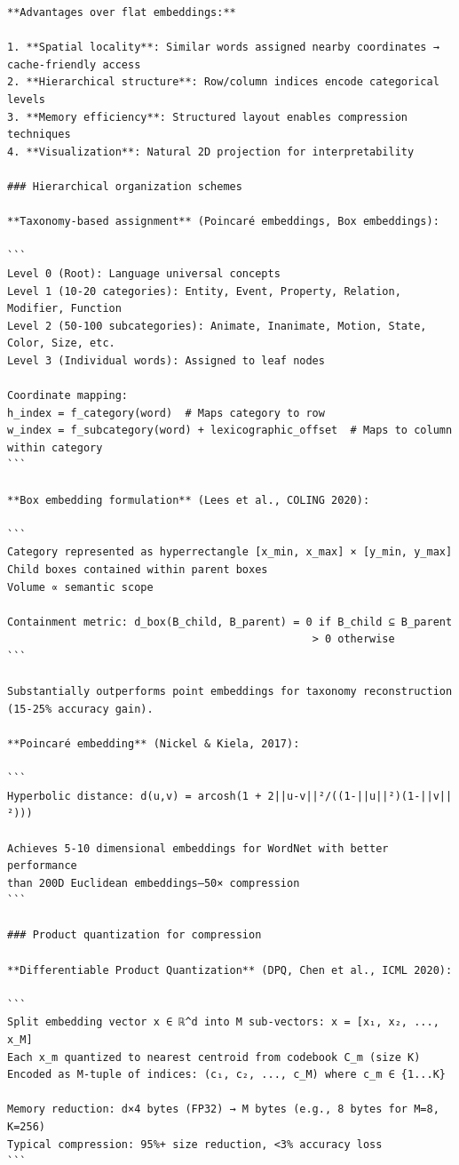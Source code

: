 \documentclass[11pt]{article}
\begin{document}
\begin{verbatim}
**Advantages over flat embeddings:**

1. **Spatial locality**: Similar words assigned nearby coordinates → cache-friendly access
2. **Hierarchical structure**: Row/column indices encode categorical levels
3. **Memory efficiency**: Structured layout enables compression techniques
4. **Visualization**: Natural 2D projection for interpretability

### Hierarchical organization schemes

**Taxonomy-based assignment** (Poincaré embeddings, Box embeddings):

```
Level 0 (Root): Language universal concepts
Level 1 (10-20 categories): Entity, Event, Property, Relation, Modifier, Function
Level 2 (50-100 subcategories): Animate, Inanimate, Motion, State, Color, Size, etc.
Level 3 (Individual words): Assigned to leaf nodes

Coordinate mapping:
h_index = f_category(word)  # Maps category to row
w_index = f_subcategory(word) + lexicographic_offset  # Maps to column within category
```

**Box embedding formulation** (Lees et al., COLING 2020):

```
Category represented as hyperrectangle [x_min, x_max] × [y_min, y_max]
Child boxes contained within parent boxes
Volume ∝ semantic scope

Containment metric: d_box(B_child, B_parent) = 0 if B_child ⊆ B_parent
                                                > 0 otherwise
```

Substantially outperforms point embeddings for taxonomy reconstruction (15-25% accuracy gain).

**Poincaré embedding** (Nickel & Kiela, 2017):

```
Hyperbolic distance: d(u,v) = arcosh(1 + 2||u-v||²/((1-||u||²)(1-||v||²)))

Achieves 5-10 dimensional embeddings for WordNet with better performance
than 200D Euclidean embeddings—50× compression
```

### Product quantization for compression

**Differentiable Product Quantization** (DPQ, Chen et al., ICML 2020):

```
Split embedding vector x ∈ ℝ^d into M sub-vectors: x = [x₁, x₂, ..., x_M]
Each x_m quantized to nearest centroid from codebook C_m (size K)
Encoded as M-tuple of indices: (c₁, c₂, ..., c_M) where c_m ∈ {1...K}

Memory reduction: d×4 bytes (FP32) → M bytes (e.g., 8 bytes for M=8, K=256)
Typical compression: 95%+ size reduction, <3% accuracy loss
```


\end{verbatim}
\end{document}
